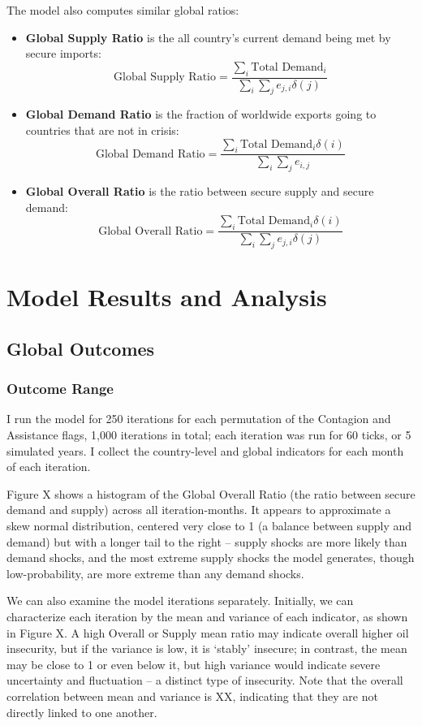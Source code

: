 \documentclass{article}
\begin{document}
The model also computes similar global ratios:
\begin{itemize}
	\item \textbf{Global Supply Ratio} is the all country's current demand being met by secure imports:
	$$
		\text{Global Supply Ratio} = \frac{\sum_i\text{Total Demand}_i}{\sum_i\sum_{j}e_{j,i}\delta(j)}
	$$
	\item \textbf{Global Demand Ratio} is the fraction of worldwide exports going to countries that are not in crisis:
	$$
		\text{Global Demand Ratio} = \frac{\sum_i \text{Total Demand}_i\delta(i)}{\sum_i\sum_{j}e_{i,j}}
	$$
	\item \textbf{Global Overall Ratio} is the ratio between secure supply and secure demand:
	$$
		\text{Global Overall Ratio} = \frac{\sum_i \text{Total Demand}_i\delta(i)}{\sum_i\sum_{j}e_{j,i}\delta(j)}
	$$
\end{itemize}


\section{Model Results and Analysis}

\subsection{Global Outcomes}

\subsubsection{Outcome Range}

I run the model for 250 iterations for each permutation of the Contagion and Assistance flags, 1,000 iterations in total; each iteration was run for 60 ticks, or 5 simulated years. I collect the country-level and global indicators for each month of each iteration. 

Figure X shows a histogram of the Global Overall Ratio (the ratio between secure demand and supply) across all iteration-months. It appears to approximate a skew normal distribution, centered very close to 1 (a balance between supply and demand) but with a longer tail to the right -- supply shocks are more likely than demand shocks, and the most extreme supply shocks the model generates, though low-probability, are more extreme than any demand shocks. 

We can also examine the model iterations separately. Initially, we can characterize each iteration by the mean and variance of each indicator, as shown in Figure X. A high Overall or Supply mean ratio may indicate overall higher oil insecurity, but if the variance is low, it is `stably' insecure; in contrast, the mean may be close to 1 or even below it, but high variance would indicate severe uncertainty and fluctuation -- a distinct type of insecurity. Note that the overall correlation between mean and variance is XX, indicating that they are not directly linked to one another.
\end{document}
